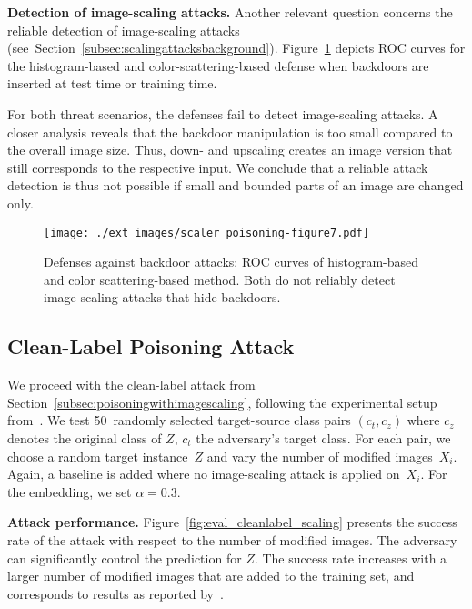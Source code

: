 \documentclass[conference]{IEEEtran}
\renewcommand{\paragraph}[1]{{\vskip 8pt \noindent\bf #1 }}
\newcommand{\ti}{\ensuremath{Z}\xspace}
\begin{document}
\paragraph{Detection of image-scaling attacks.}
Another relevant question concerns the reliable detection of 
image-scaling attacks 
(see~Section~\ref{subsec:scalingattacksbackground}). 
Figure~\ref{fig:results_detection} depicts ROC curves for the 
histogram-based and color-scattering-based defense when backdoors are 
inserted at test time or training time.

For both threat scenarios, the defenses fail to detect image-scaling 
attacks. 
A closer analysis reveals that the backdoor manipulation is too small 
compared to the overall image size. Thus, down- and upscaling creates 
an image version that still corresponds to the respective input. We 
conclude that a reliable attack detection is thus not possible if small 
and bounded parts of an image are changed only.

\begin{figure}
	\centering
	\texttt{[image: ./ext\_images/scaler\_poisoning-figure7.pdf]}
	\vspace{-0.7em}
	\caption{Defenses against backdoor attacks: ROC curves of 
	histogram-based and color scattering-based method. Both do 
	not reliably detect image-scaling attacks that hide backdoors.}
	\label{fig:results_detection}
\end{figure}


\subsection{Clean-Label Poisoning Attack}
We proceed with the clean-label attack from
Section~\ref{subsec:poisoningwithimagescaling}, following the 
experimental setup from~\citet{ShaHuaNaj+18}. 
We test 50~randomly selected target-source class pairs $(c_t, c_z)$ 
where $c_z$ denotes the original class of $\ti$, $c_t$ the adversary's 
target class. For each pair, we choose a random target instance~\ti 
and vary the number of modified images~$X_i$. Again, a baseline is 
added where no image-scaling attack is applied on~$X_i$. For the 
embedding, we set $\alpha=0.3$.

\paragraph{Attack performance.}
Figure~\ref{fig:eval_cleanlabel_scaling} presents the success rate of 
the attack with respect to the number of modified images. The adversary 
can significantly control the prediction for $\ti$. The success rate 
increases with a larger number of modified images that are added to the 
training set, and corresponds to results as reported 
by~\citet{ShaHuaNaj+18}. 
\end{document}
